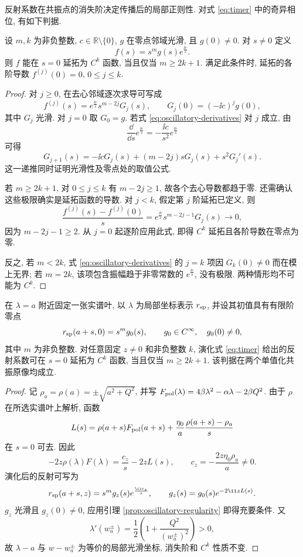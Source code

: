 反射系数在共振点的消失阶决定传播后的局部正则性. 对式 \eqref{eq:timer} 中的奇异相位, 有如下判据.

\begin{lemma}[有限阶零点与奇异相位]\label{prop:oscillatory-regularity}
设 $m,k$ 为非负整数, $c\in\mathbb R\setminus\{0\}$, $g$ 在零点邻域光滑, 且 $g(0)\ne0$. 对 $s\ne0$ 定义
\[
f(s)=s^m g(s)e^{\frac{\ii c}{s}}.
\]
则 $f$ 能在 $s=0$ 延拓为 $C^k$ 函数, 当且仅当 $m\ge2k+1$. 满足此条件时, 延拓的各阶导数 $f^{(j)}(0)=0$, $0\le j\le k$.
\end{lemma}
\begin{proof}
对 $j\ge0$, 在去心邻域逐次求导可写成
\begin{equation}\label{eq:oscillatory-derivatives}
f^{(j)}(s)=e^{\frac{\ii c}{s}}s^{m-2j}G_j(s),
\qquad G_j(0)=(-\ii c)^j g(0),
\end{equation}
其中 $G_j$ 光滑. 对 $j=0$ 取 $G_0=g$. 若式 \eqref{eq:oscillatory-derivatives} 对 $j$ 成立, 由
\[
\dfrac{\dd}{\dd s}e^{\frac{\ii c}{s}}
=-\dfrac{\ii c}{s^2}e^{\frac{\ii c}{s}}
\]
可得
\[
G_{j+1}(s)
=-\ii cG_j(s)+(m-2j)sG_j(s)+s^2G_j'(s).
\]
这一递推同时证明光滑性及零点处的取值公式.

若 $m\ge2k+1$, 对 $0\le j\le k$ 有 $m-2j\ge1$, 故各个去心导数都趋于零. 还需确认这些极限确实是延拓函数的导数. 对 $j<k$, 假定第 $j$ 阶延拓已定义, 则
\[
\dfrac{f^{(j)}(s)-f^{(j)}(0)}{s}
=e^{\frac{\ii c}{s}}s^{m-2j-1}G_j(s)\longrightarrow0,
\]
因为 $m-2j-1\ge2$. 从 $j=0$ 起逐阶应用此式, 即得 $C^k$ 延拓且各阶导数在零点为零.

反之, 若 $m<2k$, 式 \eqref{eq:oscillatory-derivatives} 的 $j=k$ 项因 $G_k(0)\ne0$ 而在模上无界; 若 $m=2k$, 该项包含振幅趋于非零常数的 $e^{\frac{\ii c}{s}}$, 没有极限. 两种情形均不可能为 $C^k$.
\end{proof}

\begin{proposition}[共振传播的局部正则性]\label{prop:resonant-regularity}
在 $\lambda=a$ 附近固定一张实谱叶, 以 $\lambda$ 为局部坐标表示 $r_{\rm sp}$, 并设其初值具有有限阶零点
\[
r_{\rm sp}(a+s,0)=s^m g_0(s),\qquad g_0\in C^\infty,\quad g_0(0)\ne0,
\]
其中 $m$ 为非负整数. 对任意固定 $z\ne0$ 和非负整数 $k$, 演化式 \eqref{eq:timer} 给出的反射系数可在 $s=0$ 延拓为 $C^k$ 函数, 当且仅当 $m\ge2k+1$. 该判据在两个单值化共振原像均成立.
\end{proposition}
\begin{proof}
记 $\rho_a=\rho(a)=\pm\sqrt{a^2+Q^2}$, 并写
$F_{\rm pol}(\lambda)=4\beta\lambda^2-\alpha\lambda-2\beta Q^2$.
由于 $\rho$ 在所选实谱叶上解析, 函数
\[
L(s)=\rho(a+s)F_{\rm pol}(a+s)
+\dfrac{\eta_0}{a}\dfrac{\rho(a+s)-\rho_a}{s}
\]
在 $s=0$ 可去. 因此
\begin{equation}\label{eq:local-resonant-phase}
-2z\rho(\lambda)F(\lambda)=\dfrac{c_z}{s}-2zL(s),\qquad
c_z=-\dfrac{2z\eta_0\rho_a}{a}\ne0.
\end{equation}
演化后的反射可写为
\[
r_{\rm sp}(a+s,z)=s^m g_z(s)e^{\frac{\ii c_z}{s}},\qquad
g_z(s)=g_0(s)e^{-2\ii zL(s)}.
\]
$g_z$ 光滑且 $g_z(0)\ne0$, 应用引理 \ref{prop:oscillatory-regularity} 即得充要条件. 又
\[
\lambda'(w_a^\pm)=\dfrac{1}{2}\left(1+\dfrac{Q^2}{(w_a^\pm)^2}\right)>0,
\]
故 $\lambda-a$ 与 $w-w_a^\pm$ 为等价的局部光滑坐标, 消失阶和 $C^k$ 性质不变.
\end{proof}
